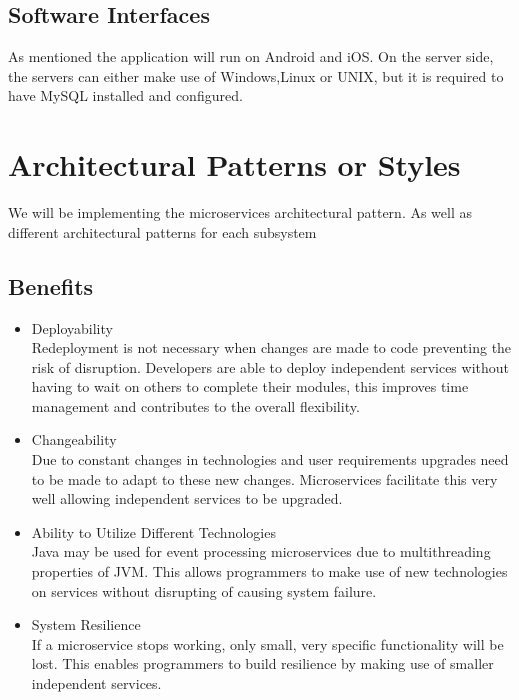 \documentclass{article}
\begin{document}
	\subsection{Software Interfaces}	

As mentioned the application will run on Android and iOS. On the server side, the servers can either make use of Windows,Linux or UNIX, but it is required
to have MySQL installed and configured.
 
	\pagebreak
 	\section{Architectural Patterns or Styles}
 	We will be implementing the microservices architectural pattern. As well as different architectural patterns for each subsystem
 	
 		\subsection{Benefits}
 			\begin{itemize}
 				\item Deployability
 				\bigskip
 				\\
 				Redeployment is not necessary when changes are made to code preventing the risk of disruption.
 				Developers are able to deploy independent services without having to wait on others to complete their modules, this improves time management and contributes to the overall flexibility.
 				\item Changeability
 				\bigskip
 				\\
 				Due to constant changes in technologies and user requirements upgrades need to be made to adapt to these new changes. Microservices  facilitate this very well allowing independent services to be upgraded.
 				\item Ability to Utilize Different Technologies
 				\bigskip
 				\\
 				Java may be used for event processing microservices due to multithreading properties of JVM.
 				This allows programmers to make use of new technologies on services without disrupting of causing system failure.
 				\item System Resilience
 				\bigskip
 				\\
 				If a microservice stops working, only small, very specific functionality will be lost. This enables programmers to build resilience by making use of smaller independent services.
 			\end{itemize}
\end{document}
